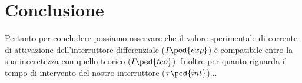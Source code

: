 \section*{Conclusione}

Pertanto per concludere possiamo osservare che il valore sperimentale di corrente di attivazione dell'interruttore differenziale ($I\ped{exp}$) è compatibile entro la sua inceretezza con quello teorico ($I\ped{teo}$).
Inoltre per quanto riguarda il tempo di intervento del nostro interruttore ($\tau\ped{int}$)...
